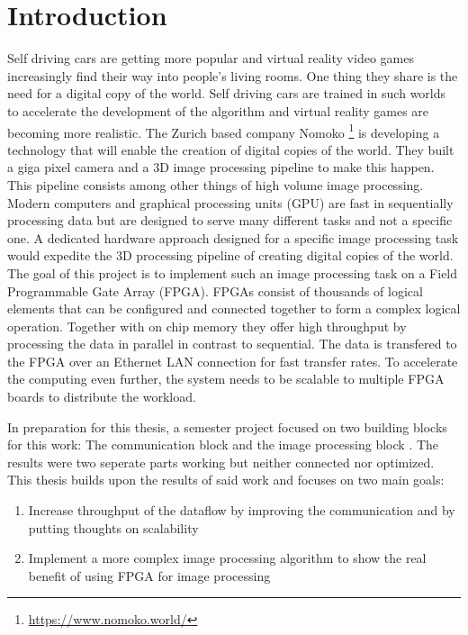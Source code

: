 
%
%
\chapter{Introduction}
Self driving cars are getting more popular and virtual reality video games
increasingly find their way into people's living rooms. One thing they share is
the need for a digital copy of the world. Self driving cars are trained in such
worlds to
accelerate the development of the algorithm and virtual reality games are
becoming more realistic. The Zurich based company Nomoko \footnote{
\url{https://www.nomoko.world/}} is developing a
technology that will enable the creation of digital copies of the world. They
built a giga pixel camera and a 3D image processing pipeline to make this happen. This pipeline
consists among other things of high volume image processing. Modern computers
and graphical processing units (GPU) are fast in sequentially processing data
but are designed to serve many different tasks and not a specific one. A
dedicated hardware approach designed for a specific image processing task would
expedite the 3D processing pipeline of creating digital copies of the world.
\\

The goal of this project is to implement such an image processing task on a
Field
Programmable Gate Array (FPGA). FPGAs
consist of thousands of logical elements that can be configured and connected
together to form a complex logical operation. Together with on chip
memory they offer high throughput by processing the data in parallel in contrast to
sequential. The data is transfered to the FPGA over an Ethernet LAN connection
for
fast transfer rates. To accelerate the computing even further, the system needs
to be scalable to multiple FPGA boards to distribute the workload.

In preparation for this thesis, a semester project focused on two building
blocks for this work: The communication block and the image processing block
\cite{p5report}. The results were two seperate parts working but neither
connected nor optimized. This thesis builds upon the results of said work and
focuses on two main goals:

\begin{enumerate}
    \item Increase throughput of the dataflow by improving the communication and
    by putting thoughts on scalability
    \item Implement a more complex image processing algorithm to show the real
    benefit of using FPGA for image processing
\end{enumerate}
%     

